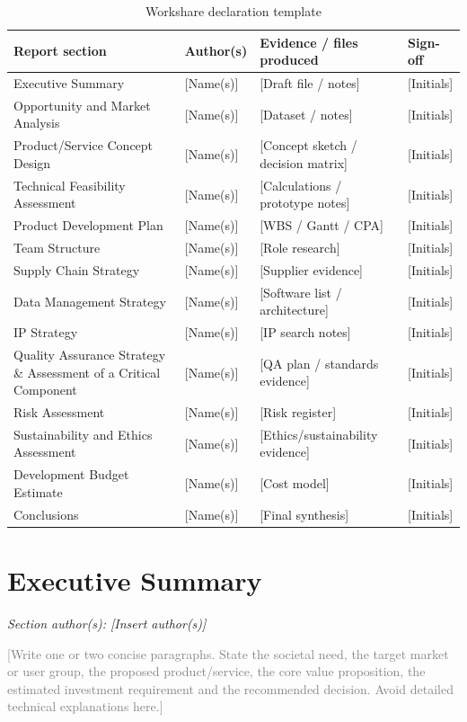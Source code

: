 \documentclass[11pt,a4paper]{article}
\newcommand{\placeholder}[1]{\textcolor{gray}{#1}}
\begin{document}
\begin{table}[H]
\centering
\caption{Workshare declaration template}
\footnotesize
\begin{tabularx}{\textwidth}{L{4.4cm}Y Y L{2cm}}
\toprule
\textbf{Report section} & \textbf{Author(s)} & \textbf{Evidence / files produced} & \textbf{Sign-off} \\
\midrule
Executive Summary & [Name(s)] & [Draft file / notes] & [Initials] \\
Opportunity and Market Analysis & [Name(s)] & [Dataset / notes] & [Initials] \\
Product/Service Concept Design & [Name(s)] & [Concept sketch / decision matrix] & [Initials] \\
Technical Feasibility Assessment & [Name(s)] & [Calculations / prototype notes] & [Initials] \\
Product Development Plan & [Name(s)] & [WBS / Gantt / CPA] & [Initials] \\
Team Structure & [Name(s)] & [Role research] & [Initials] \\
Supply Chain Strategy & [Name(s)] & [Supplier evidence] & [Initials] \\
Data Management Strategy & [Name(s)] & [Software list / architecture] & [Initials] \\
IP Strategy & [Name(s)] & [IP search notes] & [Initials] \\
Quality Assurance Strategy \& Assessment of a Critical Component & [Name(s)] & [QA plan / standards evidence] & [Initials] \\
Risk Assessment & [Name(s)] & [Risk register] & [Initials] \\
Sustainability and Ethics Assessment & [Name(s)] & [Ethics/sustainability evidence] & [Initials] \\
Development Budget Estimate & [Name(s)] & [Cost model] & [Initials] \\
Conclusions & [Name(s)] & [Final synthesis] & [Initials] \\
\bottomrule
\end{tabularx}
\end{table}

\tableofcontents
\clearpage
{}

\section{Executive Summary}
\textit{Section author(s): [Insert author(s)]}

\placeholder{[Write one or two concise paragraphs. State the societal need, the target market or user group, the proposed product/service, the core value proposition, the estimated investment requirement and the recommended decision. Avoid detailed technical explanations here.]}
\end{document}
